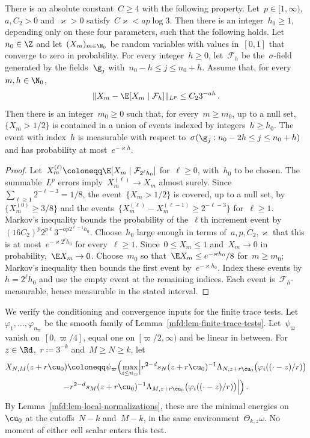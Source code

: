 \documentclass[11pt]{amsart}
\begin{document}
\begin{lemma}
\label{mfd:lem-rare-tests}
There is an absolute constant~$C\geq4$ with the following property. Let~$p\in[1,\infty)$,~$a,C_2>0$ and~$\varkappa>0$ satisfy~$C\varkappa<ap\log3$. Then there is an integer~$h_0\geq1$, depending only on these four parameters, such that the following holds. Let~$n_0\in\Z$ and let~$(X_m)_{m\in\N_0}$ be random variables with values in~$[0,1]$ that converge to zero in probability. For every integer~$h\geq0$, let~$\mathcal F_h$ be the~$\sigma$-field generated by the fields~$\g_j$ with~$n_0-h\leq j\leq n_0+h$. Assume that, for every~$m,h\in\N_0$,
\begin{equation*}
	\|X_m-\E[X_m\mid\mathcal F_h]\|_{L^p}
	\leq C_23^{-ah}\,.
\end{equation*}
Then there is an integer~$m_0\geq0$ such that, for every~$m\geq m_0$, up to a null set,~$\{X_m>1/2\}$ is contained in a union of events indexed by integers~$h\geq h_0$. The event with index~$h$ is measurable with respect to~$\sigma(\g_j:n_0-2h\leq j\leq n_0+h)$ and has probability at most~$e^{-\varkappa h}$.
\end{lemma}
\begin{proof}
Let~$X_m^{(\ell)}\coloneqq\E[X_m\mid\mathcal F_{2^\ell h_0}]$ for~$\ell\geq0$, with~$h_0$ to be chosen. The summable~$L^p$ errors imply~$X_m^{(\ell)}\to X_m$ almost surely. Since~$\sum_{\ell\geq1}2^{-\ell-3}=1/8$, the event~$\{X_m>1/2\}$ is covered, up to a null set, by~$\{X_m^{(0)}\geq3/8\}$ and the events~$\{X_m^{(\ell)}-X_m^{(\ell-1)}\geq2^{-\ell-3}\}$ for~$\ell\geq1$. Markov's inequality bounds the probability of the~$\ell$th increment event by~$(16C_2)^p2^{p\ell}3^{-ap2^{\ell-1}h_0}$. Choose~$h_0$ large enough in terms of~$a,p,C_2,\varkappa$ that this is at most~$e^{-\varkappa2^\ell h_0}$ for every~$\ell\geq1$. Since~$0\leq X_m\leq1$ and~$X_m\to0$ in probability,~$\E X_m\to0$. Choose~$m_0$ so that~$\E X_m\leq e^{-\varkappa h_0}/8$ for~$m\geq m_0$; Markov's inequality then bounds the first event by~$e^{-\varkappa h_0}$. Index these events by~$h=2^\ell h_0$ and use the empty event at the remaining indices. Each event is~$\mathcal F_h$-measurable, hence measurable in the stated interval.
\end{proof}

We verify the conditioning and convergence inputs for the finite trace tests. Let~$\varphi_1,\ldots,\varphi_{n_\varpi}$ be the smooth family of Lemma~\ref{mfd:lem-finite-trace-tests}. Let~$\psi_\varpi$ vanish on~$[0,\varpi/4]$, equal one on~$[\varpi/2,\infty)$ and be linear in between. For~$z\in\Rd$,~$r\coloneqq3^{-k}$ and~$M\geq N\geq k$, let
\begin{multline*}
	X_{N,M}(z+r\cu_0)\coloneqq\psi_\varpi\Bigl(\max_{i\leq n_\varpi}
	\Bigl|r^{2-d}s_N(z+r\cu_0)^{-1}\Lambda_{N,z+r\cu_0}\bigl(\varphi_i((\cdot-z)/r)\bigr)
	\\ -r^{2-d}s_M(z+r\cu_0)^{-1}\Lambda_{M,z+r\cu_0}\bigl(\varphi_i((\cdot-z)/r)\bigr)\Bigr|\Bigr)\,.
\end{multline*}
By Lemma~\ref{mfd:lem-local-normalizations}, these are the minimal energies on~$\cu_0$ at the cutoffs~$N-k$ and~$M-k$, in the same environment~$\Theta_{k,z}\omega$. No moment of either cell scalar enters this test.
\end{document}
